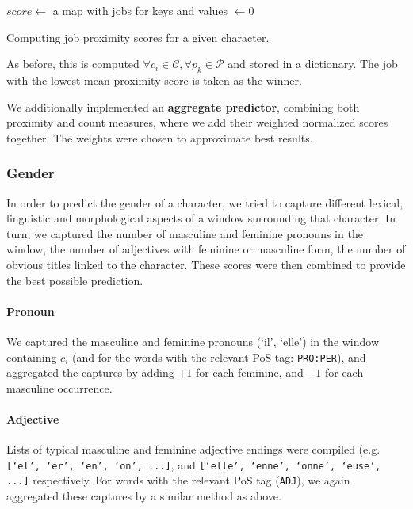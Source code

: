 \begin{algorithm} 
  $score \leftarrow$ a map with jobs for keys and values $\leftarrow 0$\;
  \caption{Computing job proximity scores for a given character.}
  \label{alg:proximity}
\end{algorithm}

As before, this is computed $\forall c_i \in \mathcal{C}, \forall p_k \in \mathcal{P}$ and stored in a dictionary. The job with the lowest mean proximity score is taken as the winner.

We additionally implemented an \textbf{aggregate predictor}, combining both proximity and count measures, where we add their weighted normalized scores together. The weights were chosen to approximate best results.
\subsubsection{Gender}
In order to predict the gender of a character, we tried to capture different lexical, linguistic and morphological aspects of a window surrounding that character. In turn, we captured the number of masculine and feminine pronouns in the window, the number of adjectives with feminine or masculine form, the number of obvious titles linked to the character. These scores were then combined to provide the best possible prediction.

\paragraph{Pronoun} We captured the masculine and feminine pronouns (`il', `elle') in the window containing $c_i$ (and for the words with the relevant PoS tag: \texttt{PRO:PER}), and aggregated the captures by adding $+1$ for each feminine, and $-1$ for each masculine occurrence.

\paragraph{Adjective} Lists of typical masculine and feminine adjective endings were compiled (e.g. \texttt{[`el', `er', `en', `on', ...]}, and \texttt{[`elle', `enne', `onne', `euse', ...]} respectively. For words with the relevant PoS tag (\texttt{ADJ}), we again aggregated these captures by a similar method as above.

